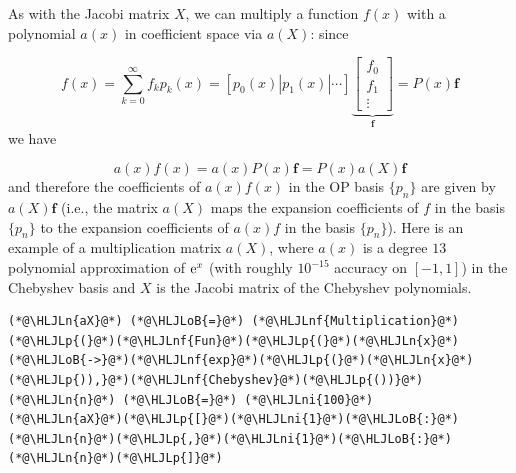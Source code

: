 \documentclass[12pt,a4paper]{article}
\newcommand{\HLJLn}[1]{#1}
\newcommand{\HLJLnf}[1]{\textcolor[RGB]{66,102,213}{#1}}
\newcommand{\HLJLni}[1]{\textcolor[RGB]{59,151,46}{#1}}
\newcommand{\HLJLoB}[1]{\textcolor[RGB]{102,102,102}{\textbf{#1}}}
\newcommand{\HLJLp}[1]{#1}
\begin{document}
As with the Jacobi matrix $X$, we can multiply a function $f(x)$ with a polynomial $a(x)$ in coefficient space via $a(X)$: since 

\[
f(x) = \sum_{k = 0}^{\infty} f_k p_k(x) = [p_0(x) | p_1(x) | \ensuremath{\cdots}]\underbrace{\begin{bmatrix}
f_0 \\
f_1 \\
\vdots
\end{bmatrix}}_{\mathbf{f}} = P(x)\mathbf{f}
\]
we have

\[
a(x)f(x) = a(x)P(x)\mathbf{f} = P(x)a(X)\mathbf{f}
\]
and therefore the coefficients of $a(x)f(x)$ in the OP basis $\{ p_n\}$ are given by $a(X)\mathbf{f}$  (i.e., the matrix $a(X)$ maps the expansion coefficients of $f$ in the basis $\{ p_n\}$ to the expansion coefficients of $a(x)f$ in the basis $\{ p_n\}$).  Here is an example of a multiplication matrix $a(X)$, where $a(x)$ is a degree $13$ polynomial approximation of ${\rm e}^{x}$ (with roughly $10^{-15}$ accuracy on $[-1, 1]$) in the Chebyshev basis and $X$ is the Jacobi matrix of the Chebyshev polynomials.


\begin{lstlisting}
(*@\HLJLn{aX}@*) (*@\HLJLoB{=}@*) (*@\HLJLnf{Multiplication}@*)(*@\HLJLp{(}@*)(*@\HLJLnf{Fun}@*)(*@\HLJLp{(}@*)(*@\HLJLn{x}@*)(*@\HLJLoB{->}@*)(*@\HLJLnf{exp}@*)(*@\HLJLp{(}@*)(*@\HLJLn{x}@*)(*@\HLJLp{)),}@*)(*@\HLJLnf{Chebyshev}@*)(*@\HLJLp{())}@*)
(*@\HLJLn{n}@*) (*@\HLJLoB{=}@*) (*@\HLJLni{100}@*)
(*@\HLJLn{aX}@*)(*@\HLJLp{[}@*)(*@\HLJLni{1}@*)(*@\HLJLoB{:}@*)(*@\HLJLn{n}@*)(*@\HLJLp{,}@*)(*@\HLJLni{1}@*)(*@\HLJLoB{:}@*)(*@\HLJLn{n}@*)(*@\HLJLp{]}@*)
\end{lstlisting}
\end{document}
